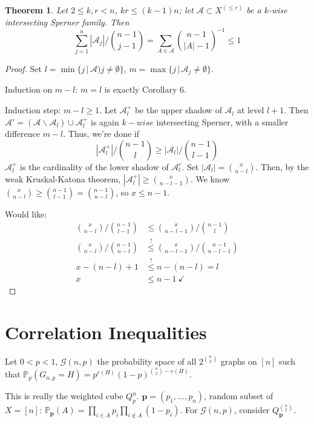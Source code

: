 \documentclass[a4paper]{article}
\newtheorem{theorem}{Theorem}
\newcommand*\abs[1]{\left|#1\right|}
\begin{document}
\begin{theorem}
	Let $2 \leq k,r < n$, $kr \leq (k-1)n$;
	let $\mathcal{A} \subset X^{(\leq r)}$ be a $k$-wise intersecting Sperner family.
	Then
	$$\sum_{j=1}^n \abs{\mathcal{A}_j} \bigg/ {n-1 \choose j-1} = \sum_{A \in \mathcal{A}} {n-1 \choose \abs{A}-1}^{-1} \leq 1$$
\end{theorem}
\begin{proof}
	Set $l = \min \{j \,|\, \mathcal{A})j \neq \emptyset\}$,
	$m = \max\{j \,|\, \mathcal{A}_j \neq \emptyset\}$.
	
	Induction on $m-l$: $m=l$ is exactly Corollary 6.
	
	Induction step: $m-l \geq 1$. Let $\mathcal{A}_l^+$ be the upper shadow of $\mathcal{A}_l$ at level $l+1$.
	Then $\mathcal{A}' = (\mathcal{A} \backslash \mathcal{A}_l) \cup \mathcal{A}_l^+$ is again $k-wise$ intersecting Sperner,
	with a smaller difference $m-l$. Thus, we're done if
	$$ \abs{\mathcal{A}_l^+} \bigg/ {n-1 \choose l} \geq \abs{\mathcal{A}_l} \bigg/ {n-1 \choose l-1} $$
	$\mathcal{A}_l^+$ is the cardinality of the lower shadow of $\mathcal{A}_l^c$.
	Set $\abs{\mathcal{A}_l} = {x \choose n-l}$.
	Then, by the weak Kruskal-Katona theorem,
	$\abs{\mathcal{A}_l^+} \geq {x \choose n-l-1}$.
	We know ${x \choose n-l} \geq {n-1 \choose l-1} = {n-1 \choose n-l}$, so $x \leq n-1$.
	
	Would like:
	\begin{align*}
		{x \choose n-l} \bigg/ {n-1 \choose l-1} &\leq {x \choose n-l-1} \bigg/ {n-1 \choose l} \\
		{x \choose n-l} \bigg/ {n-1 \choose n-l} &\overset{?}{\leq} {x \choose n-l-1} \bigg/ {n-1 \choose n-l-1} \\
		x-(n-l)+1 &\overset{?}{\leq} n-(n-l) = l \\
		x &\leq n-1\ \checkmark
	\end{align*}
\end{proof}

\section{Correlation Inequalities}
\setcounter{theorem}{0}
Let $0 < p < 1$, $\mathcal{G}(n,p)$ the probability space of all $2^{{n \choose 2}}$ graphs on $[n]$ such that
$\mathbb{P}_p(G_{n,p} = H) = p^{e(H)}(1-p)^{{n \choose 2} - e(H)}$.

This is really the weighted cube $Q_p^n$. $\mathbf{p} = (p_1, \dots, p_n)$, random subset of $X=[n]$:
$\mathbb{P}_\mathbf{p}(A) = \prod_{i \in A} p_i \prod_{i \not\in A}(1-p_i)$.
For $\mathcal{G}(n,p)$, consider $Q_\mathbf{p}^{{n \choose 2}}$.
\end{document}
